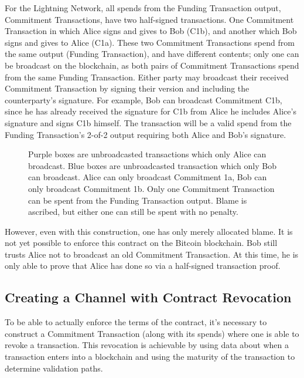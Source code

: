 \documentclass[letterpaper,11pt]{article}
\begin{document}
For the Lightning Network, all spends from the Funding Transaction output,
Commitment Transactions, have two half-signed transactions. One Commitment
Transaction in which Alice signs and gives to Bob (C1b), and another which Bob
signs and gives to Alice (C1a). These two Commitment Transactions spend from the
same output (Funding Transaction), and have different contents; only one can be
broadcast on the blockchain, as both pairs of Commitment Transactions spend from
the same Funding Transaction. Either party may broadcast their received
Commitment Transaction by signing their version and including the counterparty's
signature. For example, Bob can broadcast Commitment C1b, since he has already
received the signature for C1b from Alice \textemdash he includes Alice's
signature and signs C1b himself. The transaction will be a valid spend from the
Funding Transaction's 2-of-2 output requiring both Alice and Bob's signature.

\begin{figure}[H]
	\caption{Purple boxes are unbroadcasted transactions which only Alice
		can broadcast. Blue boxes are unbroadcasted transaction which
		only Bob can broadcast. Alice can only broadcast Commitment 1a,
		Bob can only broadcast Commitment 1b. Only one Commitment
		Transaction can be spent from the Funding Transaction output.
		Blame is ascribed, but either one can still be spent with no
		penalty.
	}
\end{figure}

However, even with this construction, one has only merely allocated blame. It is
not yet possible to enforce this contract on the Bitcoin blockchain. Bob still
trusts Alice not to broadcast an old Commitment Transaction. At this time, he is
only able to prove that Alice has done so via a half-signed transaction proof.

\subsection{Creating a Channel with Contract Revocation}

To be able to actually enforce the terms of the contract, it's necessary to
construct a Commitment Transaction (along with its spends) where one is able
to revoke a transaction. This revocation is achievable by using data about when
a transaction enters into a blockchain and using the maturity of the transaction
to determine validation paths.
\end{document}
